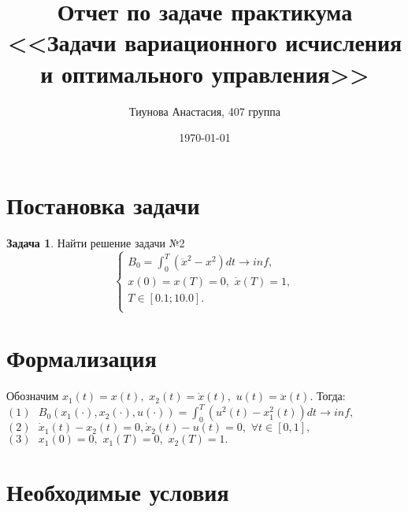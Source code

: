 \documentclass{article}
\title{Отчет по задаче практикума \\ <<Задачи вариационного исчисления и оптимального управления>>}
\date{\today}
\author{Тиунова Анастасия, 407 группа}
\theoremstyle{remark}
\theoremstyle{definition}
\newtheorem*{problem}{Задача}
\begin{document}
	\maketitle
	
	\section{Постановка задачи}
 	\begin{problem} \label{1}
Найти решение задачи №2
$$
\begin{cases}
   B_0=\int_0^T(\ddot{x}^2-x^2)dt\rightarrow inf,\\
   x(0)=x(T)=0,\,\,\dot{x}(T)=1,\\
   T\in [0.1;10.0].\\
 \end{cases} $$
\end{problem}

\section{Формализация}

	Обозначим $x_1(t)=x(t),\,\,x_2(t)=\dot{x}(t),\,\,u(t)=\ddot{x}(t).$ Тогда:\\
$(1)\,\,\,\,B_0(x_1(\cdot),x_2(\cdot),u(\cdot))=\int_0^T(u^2(t)-x_1^2(t))dt\rightarrow inf,$\\
 $(2)\,\,\,\,\dot{x}_1(t)-x_2(t)=0,\dot{x}_2(t)-u(t)=0,\,\,\forall t\in[0,1],$\\
    $(3)\,\,\,\,x_1(0)=0,\,\,x_1(T)=0,\,\,x_2(T)=1.$\\

\section{Необходимые условия}
\end{document}
